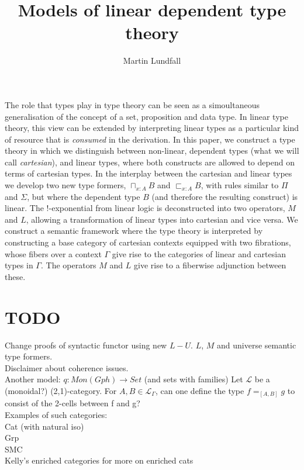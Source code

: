 
\usepackage[margin=0.5in]{geometry}
\newtheorem{lemm}[thm]{Lemma}
\newtheorem{remrk}[thm]{Remark}
\newtheorem{corl}[thm]{Corollary}
\newtheorem{expl}[thm]{Example}

\title{Models of linear dependent type theory}
\author{Martin Lundfall}
\maketitle
\abstract
The role that types play in type theory can be seen as a simoultaneous generalisation of the concept of a set, proposition and data type. In linear type theory, this view can be extended by interpreting linear types as a particular kind of resource that is \textit{consumed} in the derivation. In this paper, we construct a type theory in which we distinguish between non-linear, dependent types (what we will call \textit{cartesian}), and linear types, where both constructs are allowed to depend on terms of cartesian types. In the interplay between the cartesian and linear types we develop two new type formers, $\sqcap_{x : A}B$ and $\sqsubset_{x : A}B$, with rules similar to $\Pi$ and $\Sigma$, but where the dependent type $B$ (and therefore the resulting construct) is linear. The $!$-exponential from linear logic is deconstructed into two operators, $M$ and $L$, allowing a transformation of linear types into cartesian and vice versa. We construct a semantic framework where the type theory is interpreted by constructing a base category of cartesian contexts equipped with two fibrations, whose fibers over a context $\Gamma$ give rise to the categories of linear and cartesian types in $\Gamma$. The operators $M$ and $L$ give rise to a fiberwise adjunction between these.
\newpage
\tableofcontents
\newpage
\section{TODO}
Change proofs of syntactic functor using new $L-U$.
$L$, $M$ and universe semantic type formers.\\
Disclaimer about coherence issues.\\
Another model: $q : Mon(Gph) \to Set$ (and sets with families)
Let $\mathcal{L}$ be a (monoidal?) (2,1)-category. For $A, B \in \mathcal{L}_{\Gamma}$, can one define the type $f =_{[A, B]} g$ to consist of the 2-cells between f and g?\\
Examples of such categories:\\
Cat (with natural iso)\\
Grp\\
SMC\\
Kelly's enriched categories for more on enriched cats\\

